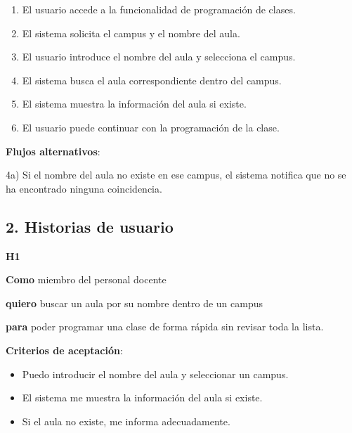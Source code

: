 \begin{solucion}[title=Caso de uso]
    \begin{enumerate}
        \item El usuario accede a la funcionalidad de programación de clases.
        \item El sistema solicita el campus y el nombre del aula.
        \item El usuario introduce el nombre del aula y selecciona el campus.
        \item El sistema busca el aula correspondiente dentro del campus.
        \item El sistema muestra la información del aula si existe.
        \item El usuario puede continuar con la programación de la clase.
    \end{enumerate}
    \textbf{Flujos alternativos}:

    4a) Si el nombre del aula no existe en ese campus, el sistema notifica que no se ha encontrado ninguna coincidencia.
\end{solucion}

\subsection{2. Historias de usuario}\label{subsec:2.-historias-de-usuario}
\begin{solucion}[title=Historias de usuario]
    \textbf{H1}

    \textbf{Como} miembro del personal docente

    \textbf{quiero} buscar un aula por su nombre dentro de un campus

    \textbf{para} poder programar una clase de forma rápida sin revisar toda la lista.

    \textbf{Criterios de aceptación}:
    \begin{itemize}
        \item Puedo introducir el nombre del aula y seleccionar un campus.
        \item El sistema me muestra la información del aula si existe.
        \item Si el aula no existe, me informa adecuadamente.
    \end{itemize}

\end{solucion}